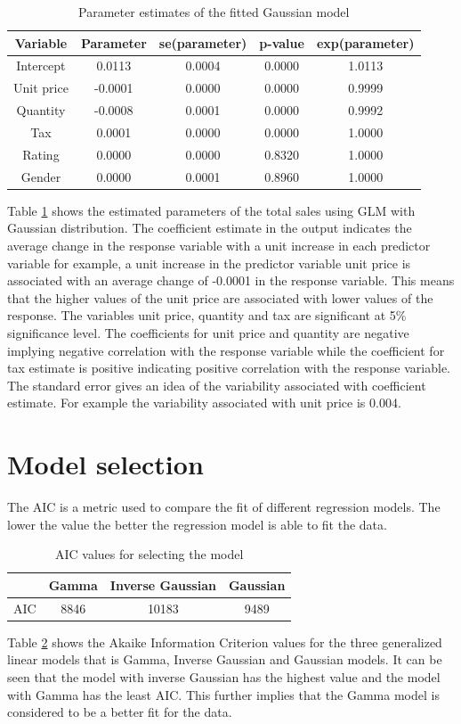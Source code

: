\begin{table}[H]
	\centering
	\caption{Parameter estimates of the fitted Gaussian model}
	\begin{tabular}{ccccc}
		\hline
		Variable   & Parameter & se(parameter) & p-value & exp(parameter) \\ \hline
		Intercept  & 0.0113    & 0.0004        & 0.0000  & 1.0113         \\
		Unit price & -0.0001   & 0.0000        & 0.0000  & 0.9999         \\
		Quantity   & -0.0008   & 0.0001        & 0.0000  & 0.9992         \\
		Tax        & 0.0001    & 0.0000        & 0.0000  & 1.0000         \\
		Rating     & 0.0000    & 0.0000        & 0.8320  & 1.0000         \\
		Gender     & 0.0000    & 0.0001        & 0.8960  & 1.0000         \\ \hline
	\end{tabular}
\label{table:Gaussian}
\end{table}
Table \ref{table:Gaussian} shows the estimated parameters of the total sales using GLM with Gaussian distribution. The coefficient estimate in the output indicates the average change in the response variable with a unit increase in each predictor variable for example, a unit increase in the predictor variable unit price is associated with an average change of -0.0001 in the response variable. This means that the higher values of the unit price are associated with lower values of the response.  The variables unit price, quantity and tax are significant at 5\% significance level. The coefficients for unit price and quantity are negative implying negative correlation with the response variable while the coefficient for tax estimate is positive indicating positive correlation with the response variable. The standard error  gives an idea of the  variability associated with coefficient estimate. For example the variability associated with unit price is 0.004.
\section{Model selection}
The AIC is a metric used to compare the fit of different regression models. The lower the value the better the regression model is able to fit the data. 
\begin{table}[H]
	\centering
	\caption{AIC values for selecting the model}
	\begin{tabular}{@{}cccc@{}}
		\toprule
		& Gamma & Inverse Gaussian & Gaussian \\ \midrule
		AIC & 8846  & 10183            & 9489     \\ \bottomrule
	\end{tabular}
\label{table:selection values}
\end{table}
Table \ref{table:selection values} shows the Akaike Information Criterion values for the three generalized linear models that is Gamma, Inverse Gaussian and Gaussian models. It can be seen that the model with inverse Gaussian has the highest value and the model with Gamma has the least AIC. This further implies that the Gamma model is considered to be a better fit for the data.
